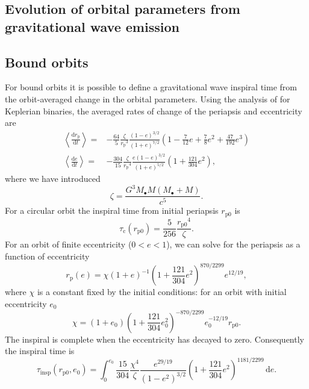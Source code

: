 \documentclass[useAMS,usedcolumn,usegraphicx,usenatbib]{mn2e}
\newcommand{\sub}[1]{\ensuremath{_\mathrm{#1}}}
\newcommand{\dd}{\ensuremath{\mathrm{d}}}
\newcommand{\diff}[2]{\ensuremath{\frac{\dd {#1}}{\dd {#2}}}}
\newcommand{\intd}[4]{\ensuremath{\displaystyle \int_{#1}^{#2}{#3}\,\dd{#4}}}
\begin{document}
\begin{onecolumn}
\section{Evolution of orbital parameters from gravitational wave emission}

\subsection{Bound orbits}

For bound orbits it is possible to define a gravitational wave inspiral time from the orbit-averaged change in the orbital parameters. Using the analysis of \citet{Peters1964} for Keplerian binaries, the averaged rates of change of the periapsis and eccentricity are
\begin{align}
\left\langle\diff{r\sub{p}}{t}\right\rangle = {} & -\frac{64}{5}\frac{\zeta}{r\sub{p}^3}\frac{(1 - e)^{3/2}}{(1 + e)^{7/2}}\left(1 - \frac{7}{12}e + \frac{7}{8}e^2 + \frac{47}{192}e^3\right) \\
\left\langle\diff{e}{t}\right\rangle = {} & -\frac{304}{15}\frac{\zeta}{r\sub{p}^4}\frac{e(1 - e)^{3/2}}{(1 + e)^{5/2}}\left(1 + \frac{121}{304}e^2\right),
\end{align}
where we have introduced
\begin{equation}
\zeta = \frac{G^3M_\bullet M(M_\bullet + M)}{c^5}.
\end{equation}
For a circular orbit the inspiral time from initial periapsis $r\sub{p0}$ is
\begin{equation}
\tau\sub{c}(r\sub{p0}) = \frac{5}{256}\frac{r\sub{p0}^4}{\zeta}.
\end{equation}
For an orbit of finite eccentricity ($0 < e < 1$), we can solve for the periapsis as a function of eccentricity
\begin{equation}
r\sub{p}(e) = \chi(1 + e)^{-1}\left(1 + \frac{121}{304}e^2\right)^{870/2299}e^{12/19},
\end{equation}
where $\chi$ is a constant fixed by the initial conditions: for an orbit with initial eccentricity $e_0$
\begin{equation}
\chi = (1 + e_0)\left(1 + \frac{121}{304}e_0^2\right)^{-870/2299}e_0^{-12/19}r\sub{p0}.
\end{equation}
The inspiral is complete when the eccentricity has decayed to zero. Consequently the inspiral time is \citep{Peters1964}
\begin{equation}
\tau\sub{insp}(r\sub{p0},e_0) = \intd{0}{e_0}{\frac{15}{304}\frac{\chi^4}{\zeta}\frac{e^{29/19}}{(1-e^2)^{3/2}}\left(1 + \frac{121}{304}e^2\right)^{1181/2299}}{e}.

\end{equation}
\end{onecolumn}
\end{document}
